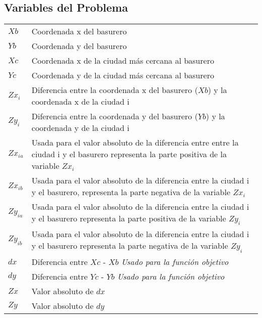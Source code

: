 \documentclass[10pt]{article}
\begin{document}
\subsection{Variables del Problema}
\begin{tabular}{l p{4.75in} }
$Xb$ & Coordenada x del basurero \\
$Yb$ & Coordenada y del basurero \\
$Xc$ & Coordenada x de la ciudad m\'as cercana al basurero \\
$Yc$ & Coordenada y de la ciudad m\'as cercana al basurero \\


$Zx_i$ & Diferencia entre la coordenada x del basurero ($Xb$) y la coordenada x de la ciudad i\\

$Zy_i$ & Diferencia entre la coordenada y del basurero ($Yb$) y la coordenada y de la ciudad i\\


$Zx_{ia}$ & Usada para el valor absoluto de la diferencia entre entre la ciudad i y el basurero representa la parte positiva de la variable $Zx_i$\\

$Zx_{ib}$ & Usada para el valor absoluto de la diferencia entre la ciudad i y el basurero, representa la parte negativa de la variable $Zx_i$\\


$Zy_{ia}$ & Usada para el valor absoluto de la diferencia entre la ciudad i y el basurero representa la parte positiva de la variable $Zy_i$\\

$Zy_{ib}$ & Usada para el valor absoluto de la diferencia entre la ciudad i y el basurero representa la parte negativa de la variable $Zy_i$\\



$dx$ & Diferencia entre $Xc$ - $Xb$ \emph{Usado para la funci\'on objetivo}\\

$dy$ &  Diferencia entre $Yc$ - $Yb$ \emph{Usado para la funci\'on objetivo}\\


$Zx$ & Valor absoluto de $dx$\\

$Zy$ & Valor absoluto de $dy$ \\
\end{tabular}
\end{document}
